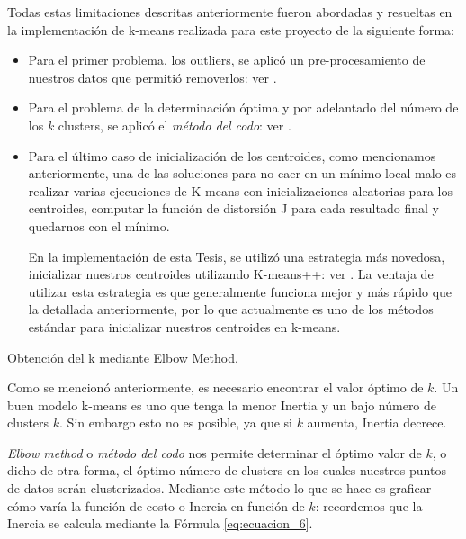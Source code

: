 \documentclass[12pt,a4paper]{article}
\makeatletter
\renewcommand\paragraph{\@startsection{paragraph}{4}{\z@}
            {-2.5ex\@plus -1ex \@minus -.25ex}
            {1.25ex \@plus .25ex}
            {\normalfont\normalsize\bfseries}}
\makeatother
\begin{document}
\begin{sloppypar}
\begin{enumerate}
\end{enumerate}

Todas estas limitaciones descritas anteriormente fueron abordadas y resueltas en la implementación de k-means realizada para este proyecto de la siguiente forma:

\begin{itemize}

\item Para el primer problema, los outliers, se aplicó un pre-procesamiento de nuestros datos que permitió removerlos: ver \textit{}.

\item Para el problema de la determinación óptima y por adelantado del número de los $k$ clusters, se aplicó el \textit{método del codo}: ver \textit{}.

\item Para el último caso de inicialización de los centroides, como mencionamos anteriormente, una de las soluciones para no caer en un mínimo local malo es realizar varias ejecuciones de K-means con inicializaciones aleatorias para los centroides, computar la función de distorsión J para cada resultado final y quedarnos con el mínimo. 

En la implementación de esta Tesis, se utilizó una estrategia más novedosa, inicializar nuestros centroides utilizando K-means++: ver \textit{}. La ventaja de utilizar esta estrategia es que generalmente funciona mejor y más rápido que la detallada anteriormente, por lo que actualmente es uno de los métodos estándar para inicializar nuestros centroides en k-means. \cite{K_means_plus_plus}
\end{itemize}

\cleardoublepage
\paragraph{Obtención del k mediante Elbow Method.}\label{Elbow_Met}

Como se mencionó anteriormente, es necesario encontrar el valor óptimo de $k$. Un buen modelo k-means es uno que tenga la menor Inertia y un bajo número de clusters $k$. Sin embargo esto no es posible, ya que si $k$ aumenta, Inertia decrece.

\textit{Elbow method} o \textit{método del codo} nos permite determinar el óptimo valor de $k$, o dicho de otra forma, el óptimo número de clusters en los cuales nuestros puntos de datos serán clusterizados. Mediante este método lo que se hace es graficar cómo varía la función de costo o Inercia en función de $k$: recordemos que la Inercia se calcula mediante la Fórmula \ref{eq:ecuacion_6}. 


\end{sloppypar}
\end{document}
